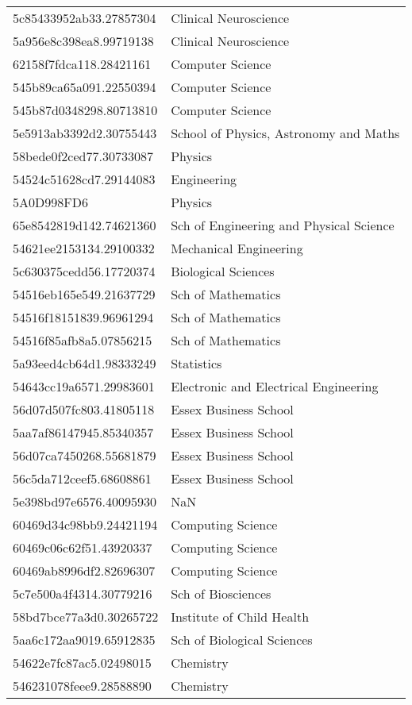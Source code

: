 \begin{tabular}{ll}
5c85433952ab33.27857304 & Clinical Neuroscience \\
5a956e8c398ea8.99719138 & Clinical Neuroscience \\
62158f7fdca118.28421161 & Computer Science \\
545b89ca65a091.22550394 & Computer Science \\
545b87d0348298.80713810 & Computer Science \\
5e5913ab3392d2.30755443 & School of Physics, Astronomy and Maths \\
58bede0f2ced77.30733087 & Physics \\
54524c51628cd7.29144083 & Engineering \\
5A0D998FD6 & Physics \\
65e8542819d142.74621360 & Sch of Engineering and Physical Science \\
54621ee2153134.29100332 & Mechanical Engineering \\
5c630375cedd56.17720374 & Biological Sciences \\
54516eb165e549.21637729 & Sch of Mathematics \\
54516f18151839.96961294 & Sch of Mathematics \\
54516f85afb8a5.07856215 & Sch of Mathematics \\
5a93eed4cb64d1.98333249 & Statistics \\
54643cc19a6571.29983601 & Electronic and Electrical Engineering \\
56d07d507fc803.41805118 & Essex Business School \\
5aa7af86147945.85340357 & Essex Business School \\
56d07ca7450268.55681879 & Essex Business School \\
56c5da712ceef5.68608861 & Essex Business School \\
5e398bd97e6576.40095930 & NaN \\
60469d34c98bb9.24421194 & Computing Science \\
60469c06c62f51.43920337 & Computing Science \\
60469ab8996df2.82696307 & Computing Science \\
5c7e500a4f4314.30779216 & Sch of Biosciences \\
58bd7bce77a3d0.30265722 & Institute of Child Health \\
5aa6c172aa9019.65912835 & Sch of Biological Sciences \\
54622e7fc87ac5.02498015 & Chemistry \\
546231078feee9.28588890 & Chemistry \\

\end{tabular}
